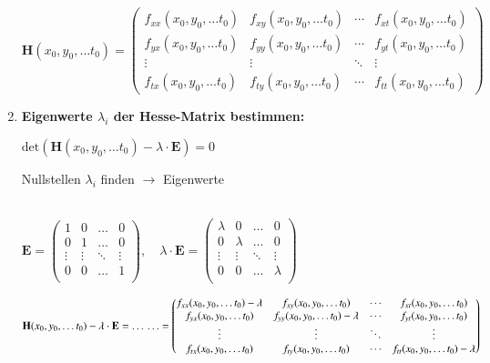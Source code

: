 \begin{enumerate}[itemsep=1ex]
    $\mathbf{H}(x_0,y_0,\ldots t_0)=
    \begin{pmatrix}
        f_{xx}(x_0,y_0,\ldots t_0)&f_{xy}(x_0,y_0, \ldots t_0)&\cdots &f_{xt}(x_0,y_0,\ldots t_0)\\
        f_{yx}(x_0,y_0,\ldots t_0)&f_{yy}(x_0,y_0, \ldots t_0)&\cdots &f_{yt}(x_0,y_0,\ldots t_0)\\
        \vdots &\vdots &\ddots &\vdots \\
        f_{tx}(x_0,y_0,\ldots t_0)&f_{ty}(x_0,y_0, \ldots t_0)&\cdots &f_{tt}(x_0,y_0,\ldots t_0)\end{pmatrix}$

    \item \textbf{Eigenwerte $\lambda_i$ der Hesse-Matrix bestimmen:}

    $\text{det}\left(\mathbf{H}(x_0,y_0,\ldots t_0) - \lambda \cdot \mathbf{E}\right)  = 0$

    Nullstellen $\lambda_i$ finden $\rightarrow  $ Eigenwerte

    \medskip
    \\
    $\mathbf{E} = \begin{pmatrix}
        1&0&\ldots &0\\
        0&1&\ldots&0\\
        \vdots &\vdots &\ddots &\vdots \\
        0&0&\ldots&1\\
    \end{pmatrix}
    , \quad
    \lambda \cdot \mathbf{E} = \begin{pmatrix}
        \lambda&0&\ldots &0\\
        0&\lambda&\ldots&0\\
        \vdots &\vdots &\ddots &\vdots \\
        0&0&\ldots&\lambda\\
    \end{pmatrix}$

    \medskip
    $\mathbf{H}(x_0,y_0,\ldots t_0) - \lambda \cdot \mathbf{E} = \ldots \\
    \ldots  = 
    \begin{pmatrix}
        f_{xx}(x_0,y_0,\ldots t_0)- \lambda&f_{xy}(x_0,y_0, \ldots t_0)&\cdots &f_{xt}(x_0,y_0,\ldots t_0)\\
        f_{yx}(x_0,y_0,\ldots t_0)&f_{yy}(x_0,y_0, \ldots t_0)- \lambda&\cdots &f_{yt}(x_0,y_0,\ldots t_0)\\
        \vdots &\vdots &\ddots &\vdots \\
        f_{tx}(x_0,y_0,\ldots t_0)&f_{ty}(x_0,y_0, \ldots t_0)&\cdots &f_{tt}(x_0,y_0,\ldots t_0)- \lambda\end{pmatrix}$


\end{enumerate}
